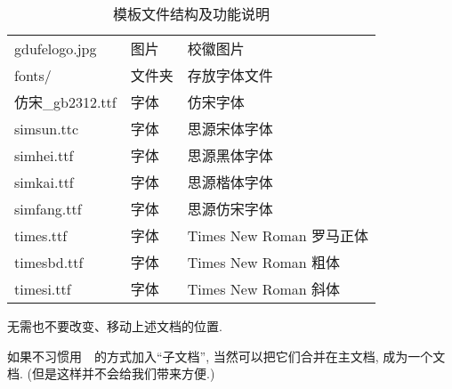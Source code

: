 \begin{table}[ht]
\begin{tabular}{lll}
        \quad gdufelogo.jpg                 & 图片     & 校徽图片                                  \\
        fonts/                              & 文件夹    & 存放字体文件                                \\
        \quad 仿宋\_gb2312.ttf                & 字体     & 仿宋字体                                  \\
        \quad simsun.ttc                    & 字体     & 思源宋体字体                                \\
        \quad simhei.ttf                    & 字体     & 思源黑体字体                                \\
        \quad simkai.ttf                    & 字体     & 思源楷体字体                                \\
        \quad simfang.ttf                   & 字体     & 思源仿宋字体                                \\
        \quad times.ttf                     & 字体     & Times New Roman 罗马正体                  \\
        \quad timesbd.ttf                   & 字体     & Times New Roman 粗体                    \\
        \quad timesi.ttf                    & 字体     & Times New Roman 斜体                    \\
        \bottomrule
    \end{tabular}
    \caption{模板文件结构及功能说明}
\end{table}

无需也不要改变、移动上述文档的位置. \the\baselineskip

如果不习惯用~\verb||~的方式加入``子文档'', 当然可以把它们合并在主文档, 成为一个文档.
({\kaishu 但是这样并不会给我们带来方便.}) \the\baselineskip



